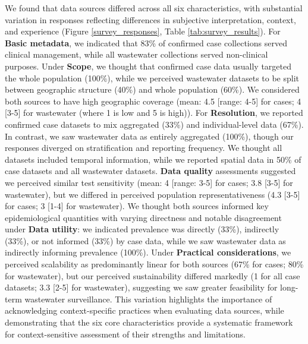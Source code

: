 \documentclass{article}
\begin{document}
We found that data sources differed across all six characteristics, with substantial variation in responses reflecting differences in subjective interpretation, context, and experience (Figure \ref{survey_responses}, Table \ref{tab:survey_results}). For \textbf{Basic metadata}, we indicated that 83\% of confirmed case collections served clinical management, while all wastewater collections served non-clinical purposes. Under \textbf{Scope}, we thought that confirmed case data usually targeted the whole population (100\%), while we perceived wastewater datasets to be split between geographic structure (40\%) and whole population (60\%). We considered both sources to have high geographic coverage (mean: 4.5 [range: 4-5] for cases; 4 [3-5] for wastewater (where 1 is low and 5 is high)). For \textbf{Resolution}, we reported confirmed case datasets to mix aggregated (33\%) and individual-level data (67\%). In contrast, we saw wastewater data as entirely aggregated (100\%), though our responses diverged on stratification and reporting frequency. We thought all datasets included temporal information, while we reported spatial data in 50\% of case datasets and all wastewater datasets. \textbf{Data quality} assessments suggested we perceived similar test sensitivity (mean: 4 [range: 3-5] for cases; 3.8 [3-5] for wastewater), but we differed in perceived population representativeness (4.3 [3-5] for cases; 3 [1-4] for wastewater). We thought both sources informed key epidemiological quantities with varying directness and notable disagreement under \textbf{Data utility}: we indicated prevalence was directly (33\%), indirectly (33\%), or not informed (33\%) by case data, while we saw wastewater data as indirectly informing prevalence (100\%). Under \textbf{Practical considerations}, we perceived scalability as predominantly linear for both sources (67\% for cases; 80\% for wastewater), but our perceived sustainability differed markedly (1 for all case datasets; 3.3 [2-5] for wastewater), suggesting we saw greater feasibility for long-term wastewater surveillance. This variation highlights the importance of acknowledging context-specific practices when evaluating data sources, while demonstrating that the six core characteristics provide a systematic framework for context-sensitive assessment of their strengths and limitations.
\end{document}
